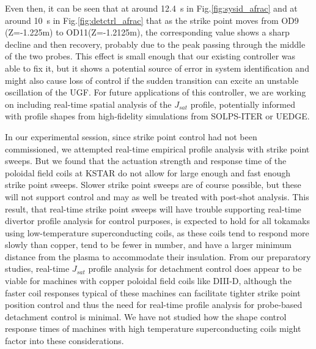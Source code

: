 Even then, it can be seen that at around 12.4~s in Fig.\ref{fig:sysid_afrac} and at around 10~s in Fig.\ref{fig:detctrl_afrac} that as the strike point moves from OD9 (Z=-1.225m) to OD11(Z=-1.2125m), the corresponding \Afrac{} value shows a sharp decline and then recovery, probably due to the peak passing through the middle of the two probes.
This effect is small enough that our existing controller was able to fix it, but it shows a potential source of error in system identification and might also cause loss of control if the sudden transition can excite an unstable oscillation of the \ac{UGF}.
For future applications of this controller, we are working on including real-time spatial analysis of the $J_{sat}$ profile, potentially informed with profile shapes from high-fidelity simulations from SOLPS-ITER or UEDGE.

In our experimental session, since strike point control had not been commissioned, we attempted real-time empirical profile analysis with strike point sweeps.
But we found that the actuation strength and response time of the poloidal field coils at KSTAR do not allow for large enough and fast enough strike point sweeps.
Slower strike point sweeps are of course possible, but these will not support control and may as well be treated with post-shot analysis.
This result, that real-time strike point sweeps will have trouble supporting real-time divertor profile analysis for control purposes, is expected to hold for all tokamaks using low-temperature superconducting coils, as these coils tend to respond more slowly than copper, tend to be fewer in number, and have a larger minimum distance from the plasma to accommodate their insulation.
From our preparatory studies, real-time $J_{sat}$ profile analysis for detachment control does appear to be viable for machines with copper poloidal field coils like \mbox{DIII-D}, although the faster coil responses typical of these machines can facilitate tighter strike point position control and thus the need for real-time profile analysis for probe-based detachment control is minimal.
We have not studied how the shape control response times of machines with high temperature superconducting coils might factor into these considerations.

